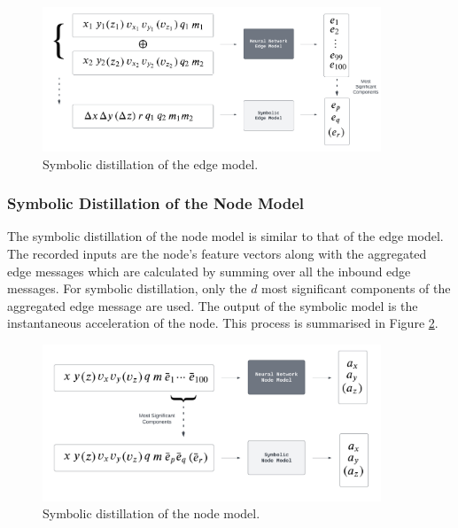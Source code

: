 \documentclass[11pt]{article}
\begin{document}
\begin{figure}[H]
    \centering
    \includegraphics[width=0.9\textwidth]{figs/edge_distillation.png}
    \caption{Symbolic distillation of the edge model.}
    \label{fig:edge_model_symbolic_distillation}
\end{figure}
\subsubsection{Symbolic Distillation of the Node Model}
The symbolic distillation of the node model is similar to that of the edge model. The recorded inputs are the node's feature vectors along with the aggregated edge messages which are calculated by summing over all the inbound edge messages. For symbolic distillation, only the $d$ most significant components of the aggregated edge message are used. The output of the symbolic model is the instantaneous acceleration of the node. This process is summarised in Figure \ref{fig:node_model_symbolic_distillation}.
\begin{figure}[H]
    \centering
    \includegraphics[width=0.9\textwidth]{figs/node_distillation.png}
    \caption{Symbolic distillation of the node model.}
    \label{fig:node_model_symbolic_distillation}
\end{figure}
\end{document}
